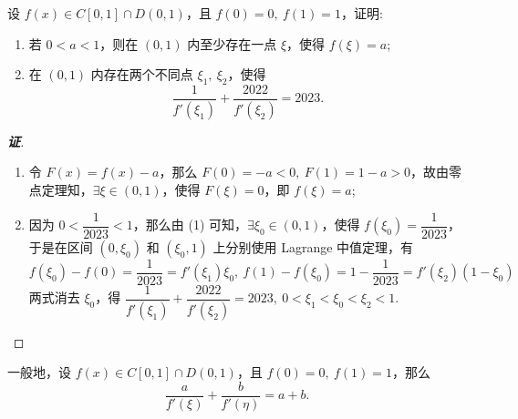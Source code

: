 \begin{example}
    设 $f(x)\in C[0,1]\cap D(0,1)$，且 $f(0)=0,~f(1)=1$，证明:
    \begin{enumerate}[label=(\arabic{*})]
        \item 若 $0<a<1$，则在 $(0,1)$ 内至少存在一点 $\xi$，使得 $f(\xi)=a$;
        \item 在 $(0,1)$ 内存在两个不同点 $\xi_1,~\xi_2$，使得 $$\dfrac{1}{f'(\xi_1)}+\dfrac{2022}{f'(\xi_2)}=2023.$$
    \end{enumerate}
\end{example}
\begin{proof}[{\songti \textbf{证}}]
    \begin{enumerate}[label=(\arabic{*})]
        \item 令 $F(x)=f(x)-a$，那么 $F(0)=-a<0,~F(1)=1-a>0$，故由零点定理知，$\exists\xi\in(0,1)$，使得 $F(\xi)=0$，即 $f(\xi)=a$;
        \item 因为 $0<\dfrac{1}{2023}<1$，那么由 (1) 可知，$\exists\xi_0\in(0,1)$，使得 $f(\xi_0)=\dfrac{1}{2023}$，于是在区间 $(0,\xi_0)$ 和 $(\xi_0,1)$ 上分别使用 Lagrange 中值定理，有
              $$f(\xi_0)-f(0)=\dfrac{1}{2023}=f'(\xi_1)\xi_0,~f(1)-f(\xi_0)=1-\dfrac{1}{2023}=f'(\xi_2)(1-\xi_0)$$
              两式消去 $\xi_0$，得 $\dfrac{1}{f'(\xi_1)}+\dfrac{2022}{f'(\xi_2)}=2023,~0<\xi_1<\xi_0<\xi_2<1.$
    \end{enumerate}
\end{proof}
\begin{inference}
    一般地，设 $f(x)\in C[0,1]\cap D(0,1)$，且 $f(0)=0,~f(1)=1$，那么 $$\dfrac{a}{f'(\xi)}+\dfrac{b}{f'(\eta)}=a+b.$$
\end{inference}

